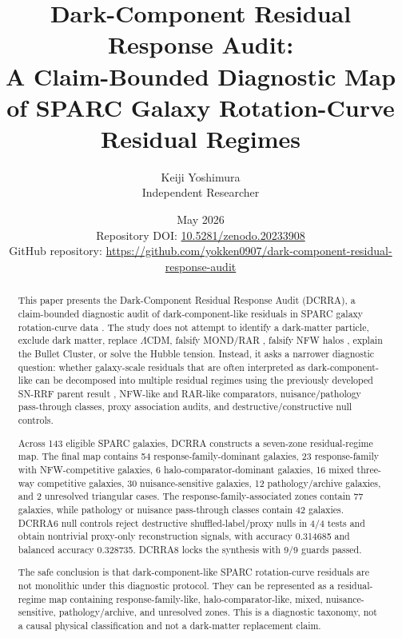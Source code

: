 \documentclass[11pt,a4paper]{article}
\title{Dark-Component Residual Response Audit:\\
A Claim-Bounded Diagnostic Map of SPARC Galaxy Rotation-Curve Residual Regimes}
\author{Keiji Yoshimura\\Independent Researcher}
\date{May 2026\\\vspace{0.5em}\small Repository DOI: \href{https://doi.org/10.5281/zenodo.20233908}{10.5281/zenodo.20233908}\\\small GitHub repository: \url{https://github.com/yokken0907/dark-component-residual-response-audit}}
\begin{document}
\maketitle

\begin{abstract}
This paper presents the Dark-Component Residual Response Audit (DCRRA), a claim-bounded diagnostic audit of dark-component-like residuals in SPARC galaxy rotation-curve data \cite{lelli2016}. The study does not attempt to identify a dark-matter particle, exclude dark matter, replace $\Lambda$CDM, falsify MOND/RAR \cite{milgrom1983,mcgaugh2016}, falsify NFW halos \cite{nfw1997}, explain the Bullet Cluster, or solve the Hubble tension. Instead, it asks a narrower diagnostic question: whether galaxy-scale residuals that are often interpreted as dark-component-like can be decomposed into multiple residual regimes using the previously developed SN-RRF parent result \cite{yoshimura2026snrrf}, NFW-like \cite{nfw1997} and RAR-like \cite{mcgaugh2016} comparators, nuisance/pathology pass-through classes, proxy association audits, and destructive/constructive null controls.

Across 143 eligible SPARC galaxies, DCRRA constructs a seven-zone residual-regime map. The final map contains 54 response-family-dominant galaxies, 23 response-family with NFW-competitive galaxies, 6 halo-comparator-dominant galaxies, 16 mixed three-way competitive galaxies, 30 nuisance-sensitive galaxies, 12 pathology/archive galaxies, and 2 unresolved triangular cases. The response-family-associated zones contain 77 galaxies, while pathology or nuisance pass-through classes contain 42 galaxies. DCRRA6 null controls reject destructive shuffled-label/proxy nulls in 4/4 tests and obtain nontrivial proxy-only reconstruction signals, with accuracy 0.314685 and balanced accuracy 0.328735. DCRRA8 locks the synthesis with 9/9 guards passed.

The safe conclusion is that dark-component-like SPARC rotation-curve residuals are not monolithic under this diagnostic protocol. They can be represented as a residual-regime map containing response-family-like, halo-comparator-like, mixed, nuisance-sensitive, pathology/archive, and unresolved zones. This is a diagnostic taxonomy, not a causal physical classification and not a dark-matter replacement claim.
\end{abstract}
\end{document}
